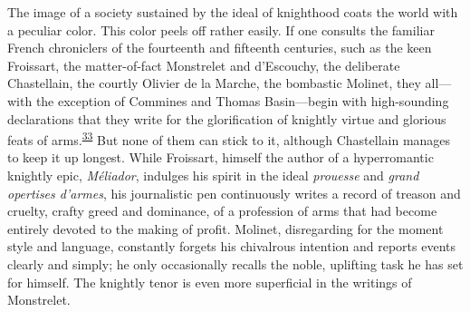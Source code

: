 The image of a society sustained by the ideal of knighthood coats the
world with a peculiar color. This color peels off rather easily. If one
consults the familiar French chroniclers of the fourteenth and
\protect\hypertarget{10_Chapter_Three__THE_HEROIC_DREAM.xhtmlux5cux23page_72}{}{}fifteenth
centuries, such as the keen Froissart, the matter-of-fact Monstrelet and
d'Escouchy, the deliberate Chastellain, the courtly Olivier de la
Marche, the bombastic Molinet, they all---with the exception of Commines
and Thomas Basin---begin with high-sounding declarations that they write
for the glorification of knightly virtue and glorious feats of
arms.\textsuperscript{\protect\hypertarget{10_Chapter_Three__THE_HEROIC_DREAM.xhtmlux5cux23id_1866}{\protect\hyperlink{23_NOTES.xhtmlux5cux23id_1867}{33}}}
But none of them can stick to it, although Chastellain manages to keep
it up longest. While Froissart, himself the author of a hyperromantic
knightly epic, \emph{Méliador}, indulges his spirit in the ideal
\emph{prouesse} and \emph{grand opertises d'armes}, his journalistic pen
continuously writes a record of treason and cruelty, crafty greed and
dominance, of a profession of arms that had become entirely devoted to
the making of profit. Molinet, disregarding for the moment style and
language, constantly forgets his chivalrous intention and reports events
clearly and simply; he only occasionally recalls the noble, uplifting
task he has set for himself. The knightly tenor is even more superficial
in the writings of Monstrelet.

